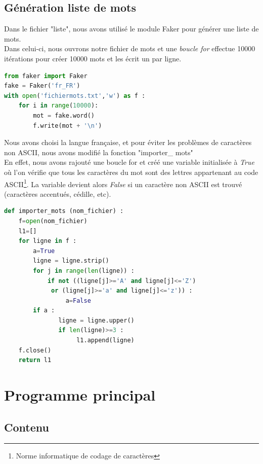 \documentclass[french,10pt,a4paper]{article}	%
\begin{document}
		
	\subsection{Génération liste de mots}
	
	
	\label{liste} Dans le fichier "liste", nous avons utilisé le module Faker pour générer une liste de mots. \\
	Dans celui-ci, nous ouvrons notre fichier de mots et une \textit{boucle for} effectue 10000 itérations pour créer 10000 mots et les écrit un par ligne. \\
	
	\begin{lstlisting}[language=Python, frame= single]
from faker import Faker
fake = Faker('fr_FR')
with open('fichiermots.txt','w') as f :
	for i in range(10000):
		mot = fake.word()
		f.write(mot + '\n')
	\end{lstlisting}
	
		Nous avons choisi la langue française, et pour éviter les problèmes de caractères non ASCII, nous avons modifié la fonction "importer\_ mots" \\
	En effet, nous avons rajouté une boucle for et créé une variable initialisée à \textit{True} où l'on vérifie que tous les caractères du mot sont des lettres appartenant au code ASCII\footnote{Norme informatique de codage de caractères}. La variable devient alors \textit{False} si un caractère non ASCII est trouvé (caractères accentués, cédille, etc).\\
		
	\begin{lstlisting}[language=Python, frame= single]
def importer_mots (nom_fichier) :
    f=open(nom_fichier)
    l1=[]
    for ligne in f :
        a=True
        ligne = ligne.strip() 			
        for j in range(len(ligne)) :
        	if not ((ligne[j]>='A' and ligne[j]<='Z')
        	 or (ligne[j]>='a' and ligne[j]<='z')) :
        	     a=False
        if a :
               ligne = ligne.upper() 			
               if len(ligne)>=3 :            
                    l1.append(ligne) 				
    f.close()
    return l1
	\end{lstlisting}
	
\newpage
\section{Programme principal}


	\subsection{Contenu}
	
\end{document}
